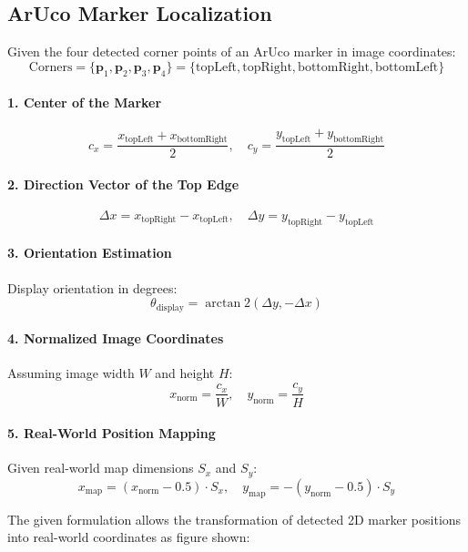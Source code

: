 \newpage

\subsection*{ArUco Marker Localization}

Given the four detected corner points of an ArUco marker in image coordinates:
\[
\text{Corners} = \{ \mathbf{p}_1, \mathbf{p}_2, \mathbf{p}_3, \mathbf{p}_4 \} = \{ \text{topLeft}, \text{topRight}, \text{bottomRight}, \text{bottomLeft} \}
\]

\paragraph*{1. Center of the Marker}
\[
c_x = \frac{x_{\text{topLeft}} + x_{\text{bottomRight}}}{2}, \quad
c_y = \frac{y_{\text{topLeft}} + y_{\text{bottomRight}}}{2}
\]

\paragraph*{2. Direction Vector of the Top Edge}
\[
\Delta x = x_{\text{topRight}} - x_{\text{topLeft}}, \quad
\Delta y = y_{\text{topRight}} - y_{\text{topLeft}}
\]

\paragraph*{3. Orientation Estimation}
Display orientation in degrees:
\[
\theta_{\text{display}} = \arctan2(\Delta y, -\Delta x)
\]

\paragraph*{4. Normalized Image Coordinates}
Assuming image width $W$ and height $H$:
\[
x_{\text{norm}} = \frac{c_x}{W}, \quad
y_{\text{norm}} = \frac{c_y}{H}
\]

\paragraph*{5. Real-World Position Mapping}
Given real-world map dimensions $S_x$ and $S_y$:
\[
x_{\text{map}} = (x_{\text{norm}} - 0.5) \cdot S_x, \quad
y_{\text{map}} = -(y_{\text{norm}} - 0.5) \cdot S_y
\]

The given formulation allows the transformation of detected 2D marker positions into real-world coordinates as figure shown:

